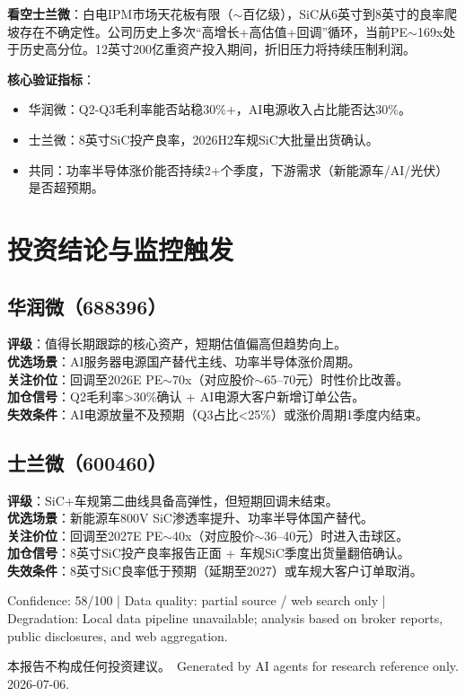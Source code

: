 \documentclass[a4paper,11pt,fontset=none]{ctexart}
\newcommand{\reportdisclaimer}{本报告不构成任何投资建议。}
\begin{document}
\textbf{看空士兰微}：白电IPM市场天花板有限（$\sim$百亿级），SiC从6英寸到8英寸的良率爬坡存在不确定性。公司历史上多次``高增长+高估值+回调''循环，当前PE$\sim$169x处于历史高分位。12英寸200亿重资产投入期间，折旧压力将持续压制利润。

\textbf{核心验证指标}：
\begin{itemize}
  \item 华润微：Q2-Q3毛利率能否站稳30\%+，AI电源收入占比能否达30\%。
  \item 士兰微：8英寸SiC投产良率，2026H2车规SiC大批量出货确认。
  \item 共同：功率半导体涨价能否持续2+个季度，下游需求（新能源车/AI/光伏）是否超预期。
\end{itemize}

\section{投资结论与监控触发}

\subsection*{华润微（688396）}
\textbf{评级}：值得长期跟踪的核心资产，短期估值偏高但趋势向上。\\
\textbf{优选场景}：AI服务器电源国产替代主线、功率半导体涨价周期。\\
\textbf{关注价位}：回调至2026E PE$\sim$70x（对应股价$\sim$65--70元）时性价比改善。\\
\textbf{加仓信号}：Q2毛利率>30\%确认 + AI电源大客户新增订单公告。\\
\textbf{失效条件}：AI电源放量不及预期（Q3占比<25\%）或涨价周期1季度内结束。

\subsection*{士兰微（600460）}
\textbf{评级}：SiC+车规第二曲线具备高弹性，但短期回调未结束。\\
\textbf{优选场景}：新能源车800V SiC渗透率提升、功率半导体国产替代。\\
\textbf{关注价位}：回调至2027E PE$\sim$40x（对应股价$\sim$36--40元）时进入击球区。\\
\textbf{加仓信号}：8英寸SiC投产良率报告正面 + 车规SiC季度出货量翻倍确认。\\
\textbf{失效条件}：8英寸SiC良率低于预期（延期至2027）或车规大客户订单取消。

\vfill
\begin{disclosurebox}[Metadata]
\footnotesize
Confidence: 58/100 \quad | \quad
Data quality: partial source / web search only \quad | \quad
Degradation: Local data pipeline unavailable; analysis based on broker reports, public disclosures, and web aggregation.

\vspace{0.4em}
{\tiny\reportdisclaimer\ Generated by AI agents for research reference only. 2026-07-06.}
\end{disclosurebox}
\end{document}
